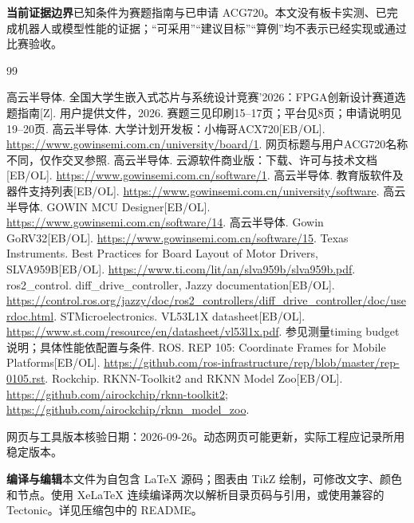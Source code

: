 \documentclass[UTF8,a4paper,zihao=-4,fontset=fandol]{ctexart}
\newcommand{\note}[2]{\par\smallskip\noindent\colorbox{Pale}{\parbox{\dimexpr\linewidth-2\fboxsep\relax}{\small\textbf{\color{Teal}#1}\quad #2}}\par\smallskip}
\newcommand{\warn}[2]{\par\smallskip\noindent\colorbox{Warm}{\parbox{\dimexpr\linewidth-2\fboxsep\relax}{\small\textbf{\color{Amber}#1}\quad #2}}\par\smallskip}
\newcommand{\nextpage}{\clearpage}
\newcommand{\tagline}[1]{{\small\color{Muted}#1}\par}
\begin{document}
\warn{当前证据边界}{已知条件为赛题指南与已申请 ACG720。本文没有板卡实测、已完成机器人或模型性能的证据；“可采用”“建议目标”“算例”均不表示已经实现或通过比赛验收。}

\nextpage
\begin{thebibliography}{99}
\small\raggedright
{} 高云半导体. 全国大学生嵌入式芯片与系统设计竞赛'2026：FPGA创新设计赛道选题指南[Z]. 用户提供文件，2026. 赛题三见印刷15--17页；平台见8页；申请说明见19--20页.
 高云半导体. 大学计划开发板：小梅哥ACX720[EB/OL]. \url{https://www.gowinsemi.com.cn/university/board/1}. 网页标题与用户ACG720名称不同，仅作交叉参照.
 高云半导体. 云源软件商业版：下载、许可与技术文档[EB/OL]. \url{https://www.gowinsemi.com.cn/software/1}.
 高云半导体. 教育版软件及器件支持列表[EB/OL]. \url{https://www.gowinsemi.com.cn/university/software}.
 高云半导体. GOWIN MCU Designer[EB/OL]. \url{https://www.gowinsemi.com.cn/software/14}.
 高云半导体. Gowin GoRV32[EB/OL]. \url{https://www.gowinsemi.com.cn/software/15}.
 Texas Instruments. Best Practices for Board Layout of Motor Drivers, SLVA959B[EB/OL]. \url{https://www.ti.com/lit/an/slva959b/slva959b.pdf}.
 ros2\_control. diff\_drive\_controller, Jazzy documentation[EB/OL]. \url{https://control.ros.org/jazzy/doc/ros2_controllers/diff_drive_controller/doc/userdoc.html}.
 STMicroelectronics. VL53L1X datasheet[EB/OL]. \url{https://www.st.com/resource/en/datasheet/vl53l1x.pdf}. 参见测量timing budget说明；具体性能依配置与条件.
 ROS. REP 105: Coordinate Frames for Mobile Platforms[EB/OL]. \url{https://github.com/ros-infrastructure/rep/blob/master/rep-0105.rst}.
 Rockchip. RKNN-Toolkit2 and RKNN Model Zoo[EB/OL]. \url{https://github.com/airockchip/rknn-toolkit2}; \url{https://github.com/airockchip/rknn_model_zoo}.
\end{thebibliography}
\tagline{网页与工具版本核验日期：2026-09-26。动态网页可能更新，实际工程应记录所用稳定版本。}

\vspace{6mm}
\note{编译与编辑}{本文件为自包含 LaTeX 源码；图表由 TikZ 绘制，可修改文字、颜色和节点。使用 XeLaTeX 连续编译两次以解析目录页码与引用，或使用兼容的 Tectonic。详见压缩包中的 README。}
\end{document}
